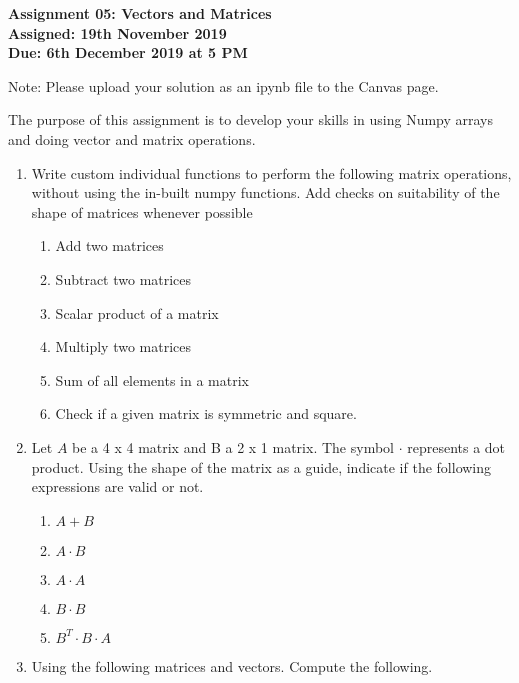 \documentclass[a4paper,12pt]{article}
\begin{document}
\begin{centering}
	\textbf{
		Assignment 05: Vectors and Matrices\\
		Assigned: 19th November 2019\\
		Due: 6th December 2019 at 5 PM\\
	}
\end{centering}


Note: Please upload your solution as an ipynb file to the Canvas page.

\vspace{1em}
 
 The purpose of this assignment is to develop your skills in using Numpy arrays and doing vector and matrix operations.
 
\begin{enumerate}
	\item Write custom individual functions to perform the following matrix operations, without using the in-built numpy functions. Add checks on suitability of the shape of matrices whenever possible 
	\begin{enumerate}
		\item Add two matrices
		\item Subtract two matrices
		\item Scalar product of a matrix
		\item Multiply two matrices
		\item Sum of all elements in a matrix
		\item Check if a given matrix is symmetric and square.
	\end{enumerate}
	\item Let $A$ be a 4 x 4 matrix and B a 2 x 1 matrix. The symbol $\cdot$ represents a dot product. Using the shape of the matrix as a guide, indicate if the following expressions are valid or not.
	\begin{enumerate}
		\item $ A + B$
		\item $ A \cdot B$
		\item $ A \cdot A$
		\item $ B \cdot B$
		\item $ B^T \cdot B \cdot A$
	\end{enumerate}

	\item Using the following matrices and vectors. Compute the following.
	

\end{enumerate}
\end{document}
